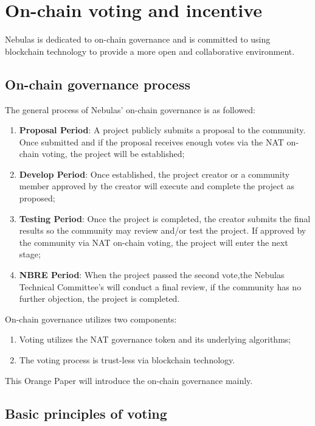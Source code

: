 \section{On-chain voting and incentive}

Nebulas is dedicated to on-chain governance and is committed to using blockchain technology to provide a more open and collaborative environment.

\subsection{On-chain governance process}
\label{governance}

The general process of Nebulas' on-chain governance is as followed:

\begin{enumerate}
	\item \textbf{Proposal Period}: A project publicly submits a proposal to the community. Once submitted and if the proposal receives enough votes via the NAT on-chain voting, the project will be established;
	\item \textbf{Develop Period}: Once established, the project creator or a community member approved by the creator will execute and complete the project as proposed;
	\item \textbf{Testing Period}: Once the project is completed, the creator submits the final results so the community may review and/or test the project. If approved by the community via NAT on-chain voting, the project will enter the next stage;
	\item \textbf{NBRE Period}: When the project passed the second vote,the Nebulas Technical Committee's will conduct a final review, if the  community has no further objection, the project is completed.
\end{enumerate}

On-chain governance utilizes two components:

\begin{enumerate}
	\item Voting utilizes the NAT governance token and its underlying algorithms;
	\item The voting process is trust-less via blockchain technology.
\end{enumerate}

This Orange Paper will introduce the on-chain governance mainly.

\subsection{Basic principles of voting}

